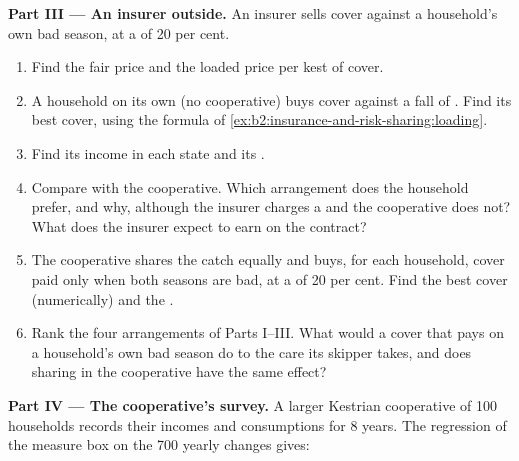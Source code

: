 \begin{problem}
\medskip
\noindent\textbf{Part III --- An insurer outside.}
An insurer sells cover against a household's own bad season, at a  of 20 per cent.
\begin{enumerate}[resume]
  \item Find the fair price and the loaded price per kest of cover.
  \item A household on its own (no cooperative) buys cover against a fall of . Find its best
        cover, using the formula of \cref{ex:b2:insurance-and-risk-sharing:loading}.
  \item Find its income in each state and its .
  \item Compare with the cooperative. Which arrangement does the household prefer, and why, although
        the insurer charges a  and the cooperative does not? What does the insurer expect to
        earn on the contract?
  \item The cooperative shares the catch equally and buys, for each household, cover paid only when
        both seasons are bad, at a  of 20 per cent. Find the best cover (numerically) and the
        .
  \item Rank the four arrangements of Parts I--III. What would a cover that pays on a household's own
        bad season do to the care its skipper takes, and does sharing in the cooperative have the same
        effect?
\end{enumerate}

\medskip
\noindent\textbf{Part IV --- The cooperative's survey.}
A larger Kestrian cooperative of 100 households records their incomes and consumptions for 8 years.
The regression of the measure box on the 700 yearly changes gives:


\end{problem}
